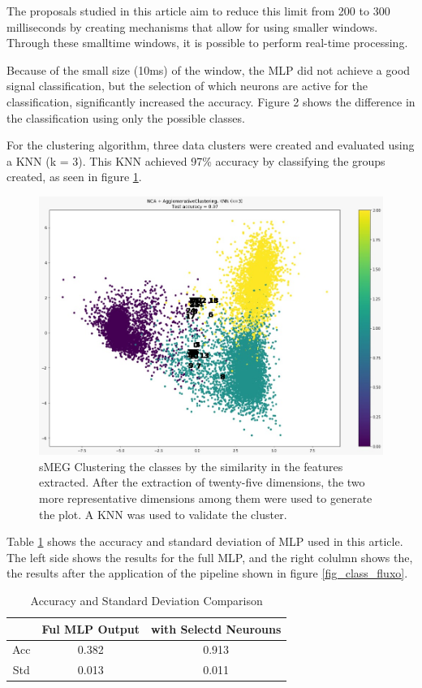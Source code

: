 \documentclass[letterpaper, 10 pt, conference]{ieeeconf}  %
\begin{document}
The proposals studied in this article aim to reduce this limit from 200 to 300 milliseconds by creating mechanisms that allow for using smaller windows. Through these smalltime windows, it is possible to perform real-time processing.

Because of the small size (10ms) of the window, the MLP did not achieve a good signal classification, but the selection of which neurons are active for the classification, significantly increased the accuracy. Figure 2 shows the difference in the classification using only the possible classes.

For the clustering algorithm, three data clusters were created and evaluated using a KNN (k = 3). This KNN achieved 97\% accuracy by classifying the groups created, as seen in figure \ref{fig_sMEG_Clustering}.

\begin{figure}[h]
	\includegraphics[width=\linewidth]{images/sMEG_Clustering.png}
	\caption {sMEG Clustering the classes by the similarity in the features extracted. After the extraction of twenty-five dimensions, the two more representative dimensions among them were used to generate the plot. A KNN was used to validate the cluster.} \label{fig_sMEG_Clustering}
\end{figure}

Table \ref{acc_std} shows the accuracy and standard deviation of MLP used in this article. The left side shows the results for the full MLP, and the right colulmn shows the, the results after the application of the pipeline shown in figure \ref{fig_class_fluxo}.

\begin{table}[h]
\caption{Accuracy and Standard Deviation Comparison}
\label{acc_std}
    \begin{center}
        \begin{tabular}{|c||c||c|}
        \hline
            & Ful MLP Output & with Selectd Neurouns \\ \hline
        Acc & 0.382          & 0.913                 \\ \hline
        Std & 0.013          & 0.011                 \\ \hline
        \end{tabular}
    \end{center}
\end{table}
\end{document}
